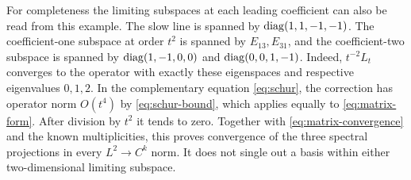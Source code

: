 For completeness the limiting subspaces at each leading coefficient
can also be read from this example. The slow line is spanned by
$\operatorname{diag}(1,1,-1,-1)$. The coefficient-one subspace at order $t^2$
is spanned by $E_{13},E_{31}$, and the coefficient-two subspace
is spanned by $\operatorname{diag}(1,-1,0,0)$ and $\operatorname{diag}(0,0,1,-1)$.
Indeed, $t^{-2}L_t$ converges to the operator with exactly these
eigenspaces and respective eigenvalues $0,1,2$. In the complementary
equation \eqref{eq:schur}, the correction has operator norm
$O(t^4)$ by \eqref{eq:schur-bound}, which applies equally to
\eqref{eq:matrix-form}. After division by $t^2$ it tends to zero.
Together with \eqref{eq:matrix-convergence} and the known
multiplicities, this proves convergence of the three spectral projections
in every $L^2\to C^k$ norm. It does not single out a basis within
either two-dimensional limiting subspace.
